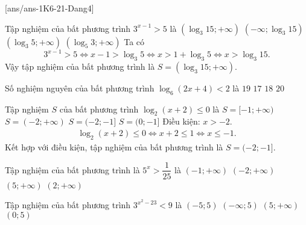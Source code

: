 \centerline{}
[ans/ans-1K6-21-Dang4]
\begin{ex}%
	Tập nghiệm của bất phương trình $3^{x-1}>5$ là
	\choice
	{\True $\left( \log_{3}15; + \infty\right) $}
	{$\left( - \infty; \log_{3}15 \right) $}
	{$\left( \log_3{5}; + \infty\right) $}
	{$\left( \log_5{3}; + \infty\right) $}
	\loigiai
	{
		Ta có
		\[3^{x-1}>5 \Leftrightarrow x - 1 > \log_{3}5  \Leftrightarrow x >  1 +\log_{3}5 \Leftrightarrow x > \log_{3} 15.\]
		Vậy tập nghiệm của bất phương trình là $S =\left( \log_{3}15; + \infty\right)$.
	}
\end{ex}
\begin{ex}%
	Số nghiệm nguyên của bất phương trình $\log_{6}(2x+4)<2$ là
	\choice
	{$19$}
	{\True $17$}
	{$18$}
	{$20$}
\end{ex}
\begin{ex}%
	Tập nghiệm $S$ của bất phương trình $\log_2(x+2)\le 0$ là
	\choice
	{$S=[-1;+\infty)$}
	{$S=(-2;+\infty)$}
	{\True $S=(-2;-1]$}
	{$S=(0;-1]$}
	\loigiai
	{Điều kiện: $x>-2$.
		{\allowdisplaybreaks
			\begin{eqnarray*}
				\log_2(x+2)\le 0\Leftrightarrow x+2\le 1
				\Leftrightarrow
				x\le -1.
			\end{eqnarray*}
		}	
		Kết hợp với điều kiện, tập nghiệm của bất phương trình là $S=(-2;-1]$.
	}
\end{ex}


\begin{ex}%
	Tập nghiệm của bất phương trình là $5^x>\dfrac{1}{25}$ là
	\choice
	{$(-1;+\infty)$}
	{\True $(-2;+\infty)$}
	{$(5;+\infty)$}
	{$(2;+\infty)$}
\end{ex}
\begin{ex}%
	Tập nghiệm của bất phương trình $3^{x^2-23}<9$ là
	\choice
	{\True $(-5;5)$}
	{$(-\infty;5)$}
	{$(5;+\infty)$}
	{$(0;5)$}
\end{ex}


